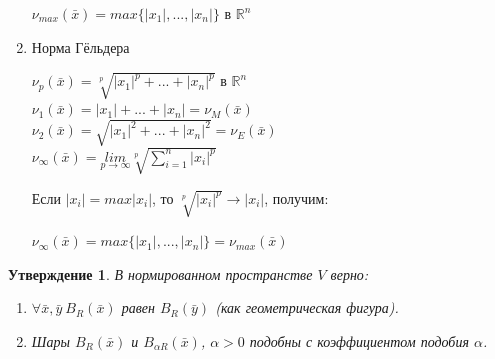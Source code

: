 \documentclass[12pt]{article}
\newtheorem*{statement}{Утверждение}
\begin{document}
\begin{enumerate}
		\begin{center}
			$\nu_{max}(\bar x) = max\{|x_1|,...,|x_n|\}$ в $\mathbb{R}^n$\\\end{center}
		\item Норма Гёльдера
		\begin{center}$\nu_p(\bar x) = \sqrt[p]{|x_1|^p+...+|x_n|^p}$ в $\mathbb{R}^n$\\
			$\nu_1(\bar x) = |x_1|+...+|x_n| = \nu_M(\bar x)$\\ 
			$\nu_2(\bar x) = \sqrt{|x_1|^2+...+|x_n|^2} = \nu_E(\bar x)$\\
			$\nu_{\infty}(\bar x) = \underset{p \to \infty}{lim}\sqrt[p]{\sum\limits_{i=1}^n |x_i|^p}$\end{center}
		Если $|x_i| = max |x_i|$, то $\sqrt[p]{|x_i|^p} \to |x_i|$, получим:
		\begin{center}$\nu_{\infty}(\bar x) = max \{|x_1|,...,|x_n|\} = \nu_{max}(\bar x)$\end{center}
	\end{enumerate}
	\begin{statement}
		В нормированном пространстве $V$ верно:\begin{enumerate}
			\item $\forall \bar x, \bar y ~B_R(\bar x)$ равен $B_R(\bar y)$ (как геометрическая фигура).
			\item Шары $B_R(\bar x)$ и $ B_{\alpha R}(\bar x)$, $\alpha > 0$ подобны с коэффициентом подобия $\alpha$. 
		\end{enumerate}
	\end{statement}
\end{document}
